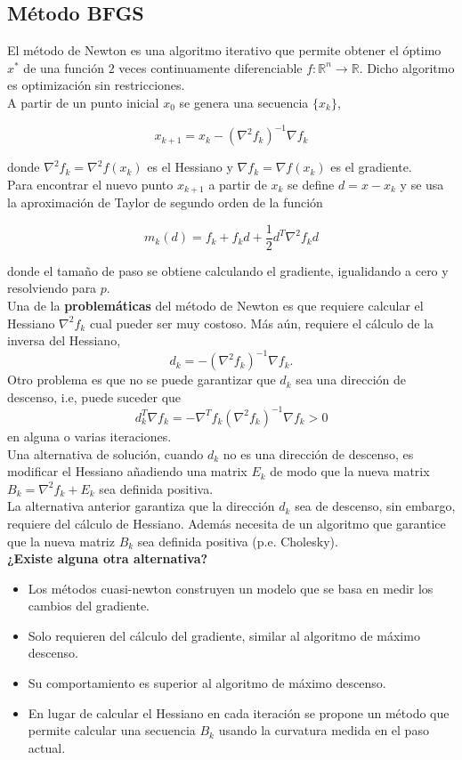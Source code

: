 \documentclass[11pt,letterpaper]{article}
\theoremstyle{definition}
\theoremstyle{definition}
\theoremstyle{definition}
\begin{document}
\subsection{Método BFGS}
El método de Newton es una algoritmo iterativo que permite obtener el óptimo $ x^* $ de una función $ 2 $ veces continuamente diferenciable $ f : \mathbb{R}^n \to \mathbb{R} $. Dicho algoritmo es optimización sin restricciones. 
\\
A partir de un punto inicial $ x_0 $ se genera una secuencia $ \{x_k\} $,
\begin{shaded*}
	\begin{equation*}
		x_{k+1} = x_k - ( \nabla^2 f_k)^{-1} \nabla f_k
	\end{equation*}
\end{shaded*}
donde $  \nabla^2 f_k = \nabla^2 f(x_k) $ es el Hessiano y $ \nabla f_k = \nabla f(x_k) $ es el gradiente.
\\
Para encontrar el nuevo punto $ x_{k+1} $ a partir de $ x_k $ se define $ d = x - x_k $ y se usa la aproximación de Taylor de segundo orden de la función
\begin{shaded*}
	\begin{equation*}
		m_k (d) = f_k + f_k d + \dfrac{1}{2} d^T \nabla^2 f_k d
	\end{equation*}
\end{shaded*}
donde el tamaño de paso se obtiene calculando el gradiente, igualidando a cero y resolviendo para $ p $.
\\
Una de la \textbf{problemáticas} del método de Newton es que requiere calcular el Hessiano $ \nabla^2 f_k $ cual pueder ser muy costoso. Más aún, requiere el cálculo de la inversa del Hessiano,
\[ d_k = - (\nabla^2 f_k)^{-1} \nabla f_k. \]
Otro problema es que no se puede garantizar que $ d_k $ sea una dirección de descenso, i.e, puede suceder que
\[ d_k^T \nabla f_k = - \nabla^T f_k (\nabla^2 f_k)^{-1} \nabla f_k > 0 \]
en alguna o varias iteraciones.
\\
Una alternativa de solución, cuando $ d_k $ no es una dirección de descenso, es modificar el Hessiano añadiendo una matrix $ E_k $ de modo que la nueva matrix $ B_k = \nabla^2 f_k + E_k $ sea definida positiva.
\\
La alternativa anterior garantiza que la dirección $ d_k $ sea de descenso, sin embargo, requiere del cálculo de Hessiano. Además necesita de un algoritmo que garantice que la nueva matriz $ B_k $ sea definida positiva (p.e. Cholesky).
\\
\textbf{¿Existe alguna otra alternativa?}
\begin{itemize}
	\item Los métodos cuasi-newton construyen un modelo que se
	basa en medir los cambios del gradiente.
	\item Solo requieren del cálculo del gradiente, similar al
	algoritmo de máximo descenso.
	\item Su comportamiento es superior al algoritmo de máximo
	descenso.
	\item En lugar de calcular el Hessiano en cada iteración se
	propone un método que permite calcular una secuencia $ B_k $ usando la curvatura medida en el paso actual.
\end{itemize}
 
\end{document}
